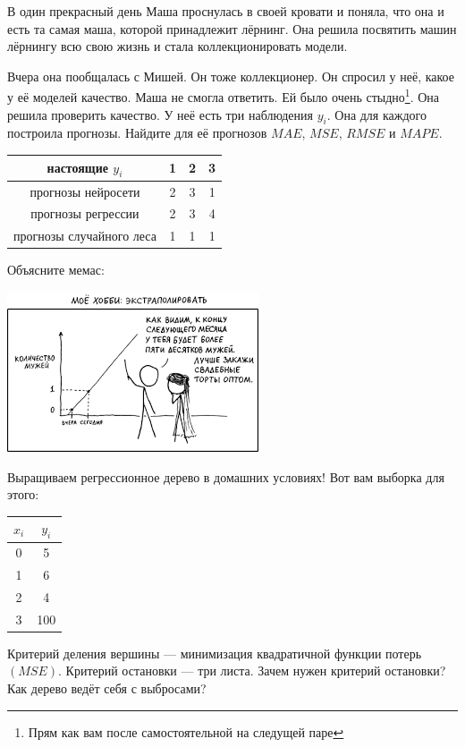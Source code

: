 \documentclass[12pt, a4paper, oneside]{article}
\theoremstyle{plain} %
\theoremstyle{definition}
\begin{document}
\begin{problem}{ }
В один прекрасный день Маша проснулась в своей кровати и поняла, что она и есть та самая маша, которой принадлежит лёрнинг. Она решила посвятить машин лёрнингу всю свою жизнь и стала коллекционировать модели.

Вчера она пообщалась с Мишей. Он тоже коллекционер. Он спросил у неё, какое у её моделей качество. Маша не смогла ответить. Ей было очень стыдно\footnote{Прям как вам после самостоятельной на следущей паре}. Она решила проверить качество. У неё есть три наблюдения $y_i$. Она для каждого построила прогнозы. Найдите для её прогнозов $MAE$, $MSE$, $RMSE$ и $MAPE$. 

\begin{center}
	\begin{tabular}{c|c|c|c}
		настоящие $y_i$ &  1 & 2 & 3 \\
		\hline
		прогнозы нейросети & 2 & 3 & 1  \\
		прогнозы регрессии &  2 & 3 & 4 \\
		прогнозы случайного леса & 1 & 1 & 1 \\
	\end{tabular}
\end{center}
\end{problem}


\begin{problem}{ }
Объясните мемас: 

\begin{center}
	\includegraphics[scale=0.8]{memes.png}
\end{center}
\end{problem}


\begin{problem}{}
Выращиваем регрессионное дерево в домашних условиях! Вот вам выборка для этого: 

\begin{center}
	\begin{tabular}{c|c}
		$x_i$ & $y_i$ \\
		\hline
		0 & 5 \\
		1 &  6\\
		2 & 4 \\
		3 & 100 \\
	\end{tabular}
\end{center}

Критерий деления вершины --- минимизация квадратичной функции потерь $(MSE)$. Критерий остановки --- три листа.  Зачем нужен критерий остановки? Как дерево ведёт себя с выбросами? 
\end{problem}
\end{document}
